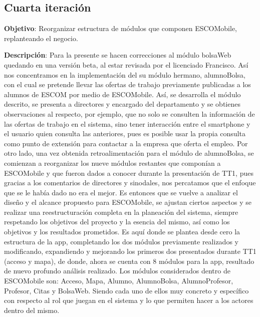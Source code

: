 
\subsection{Cuarta iteración} 

\noindent
\textbf{Objetivo}: Reorganizar estructura de módulos que componen ESCOMobile, replanteando el negocio.
\newline

\noindent
\textbf{Descripción}: Para la presente se hacen correcciones al módulo bolsaWeb quedando en una versión beta, al estar revisada por el licenciado Francisco. Así nos concentramos en la implementación del su módulo hermano, alumnoBolsa, con el cual se pretende llevar las ofertas de trabajo previamente publicadas a los alumnos de ESCOM por medio de ESCOMobile. Así, se desarrolla el módulo descrito, se presenta a directores y encargado del departamento y se obtienes observaciones al respecto, por ejemplo, que no solo se consulten la información de las ofertas de trabajo en el sistema, sino tener interacción entre el smartphone y el usuario quien consulta las anteriores, pues es posible usar la propia consulta como punto de extensión para contactar a la empresa que oferta el empleo. 
\newline
\newline
Por otro lado, una vez obtenida retroalimentación para el módulo de alumnoBolsa, se comienzan a reorganizar los nueve módulos restantes que componían a ESCOMobile y que fueron dados a conocer durante la presentación de TT1, pues gracias a los comentarios de directores y sinodales, nos percatamos que el enfoque que se le había dado no era el mejor. Es entonces que se vuelve a analizar el diseño y el alcance propuesto para ESCOMobile, se ajustan ciertos aspectos y se realizar una reestructuración completa en la planeación del sistema, siempre respetando los objetivos del proyecto y la esencia del mismo, así como los objetivos y los resultados prometidos.
\newline
Es aquí donde se plantea desde cero la estructura de la app, completando los dos módulos previamente realizados y modificando, expandiendo y mejorando los primeros dos presentados durante TT1 (acceso y mapa), de donde, ahora se cuenta con 8 módulos para la app, resultado de nuevo profundo análisis realizado. Los módulos considerados dentro de ESCOMobile son: Acceso, Mapa, Alumno, AlumnoBolsa, AlumnoProfesor, Profesor, Citas y BolsaWeb. Siendo cada uno de ellos muy concreto y específico con respecto al rol que juegan en el sistema y lo que permiten hacer a los actores dentro del mismo. 
